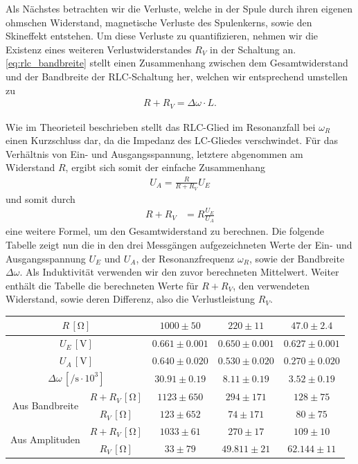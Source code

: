 Als Nächstes betrachten wir die Verluste, welche in der Spule durch ihren eigenen ohmschen Widerstand, magnetische Verluste des Spulenkerns, sowie den Skineffekt entstehen. Um diese Verluste zu quantifizieren, nehmen wir die Existenz eines weiteren Verlustwiderstandes $R_V$ in der Schaltung an. \eqref{eq:rlc_bandbreite} stellt einen Zusammenhang zwischen dem Gesamtwiderstand und der Bandbreite der RLC-Schaltung her, welchen wir entsprechend umstellen zu
\begin{align}
  R + R_V = \Delta \omega \cdot L.
\end{align}

Wie im Theorieteil beschrieben stellt das RLC-Glied im Resonanzfall bei $\omega_R$ einen Kurzschluss dar, da die Impedanz des LC-Gliedes verschwindet. Für das Verhältnis von Ein- und Ausgangsspannung, letztere abgenommen am Widerstand $R$, ergibt sich somit der einfache Zusammenhang
\begin{align}
  U_A = \frac{R}{R + R_V} U_E
\end{align}
und somit durch
\begin{align}
  R + R_V &= R \frac{U_E}{U_A}
\end{align}
eine weitere Formel, um den Gesamtwiderstand zu berechnen. Die folgende Tabelle zeigt nun die in den drei Messgängen aufgezeichneten Werte der Ein- und Ausgangsspannung $U_E$ und $U_A$, der Resonanzfrequenz $\omega_R$, sowie der Bandbreite $\Delta \omega$. Als Induktivität verwenden wir den zuvor berechneten Mittelwert. Weiter enthält die Tabelle die berechneten Werte für $R + R_V$, den verwendeten Widerstand, sowie deren Differenz, also die Verlustleistung $R_V$.

\renewcommand{\arraystretch}{1.5}
\begin{table}[H]
  \centering
  \begin{tabular}{|c|c|c|c|c|}
    \hline
    \multicolumn{2}{|c|}{$R\,[\si{\ohm}]$} & $1000 \pm 50$ & $220 \pm 11$ & $47.0 \pm 2.4$ \\
    \hline
    \multicolumn{2}{|c|}{$U_E\,[\si{\volt}]$} & $0.661 \pm 0.001$ & $0.650 \pm 0.001$ & $0.627 \pm 0.001$ \\
    \hline
    \multicolumn{2}{|c|}{$U_A\,[\si{\volt}]$} & $0.640 \pm 0.020$ & $0.530 \pm 0.020$ & $0.270 \pm 0.020$ \\
    \hline
    \multicolumn{2}{|c|}{$\Delta \omega\,[\si{\per\second} \cdot 10^3]$} & $30.91 \pm 0.19$ & $8.11 \pm 0.19$ & $3.52 \pm 0.19$ \\
    \hline
    \hline
    \multirow{2}{*}{Aus Bandbreite} & $R + R_V\,[\si{\ohm}]$ & $1123 \pm 650$ & $294 \pm 171$ & $128 \pm 75$ \\
    \cline{2-5}
    & $R_V\,[\si{\ohm}]$ & $123 \pm 652$ & $74 \pm 171$ & $80 \pm 75$ \\
    \hline
    \hline
    \multirow{2}{*}{Aus Amplituden} & $R + R_V\,[\si{\ohm}]$  & $1033 \pm 61$ & $270 \pm 17$ & $109 \pm 10$ \\
    \cline{2-5}
    & $R_V\,[\si{\ohm}]$ & $33 \pm 79$ & $49.811 \pm 21$ & $62.144 \pm 11$ \\
    \hline
  \end{tabular}
\end{table}
\renewcommand{\arraystretch}{1}

